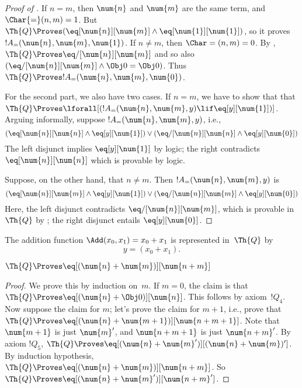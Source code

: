 \documentclass[../../../include/open-logic-section]{subfiles}
\begin{document}
\begin{proof}[Proof of ]
If $n = m$, then $\num{n}$ and $\num{m}$ are the same term, and
$\Char{=}(n, m) = 1$. But $\Th{Q} \Proves (\eq[\num{n}][\num{m}] \land
\eq[\num{1}][\num{1}])$, so it proves $!A_=(\num{n}, \num{m},
\num{1})$.  If $n \neq m$, then $\Char=(n, m) = 0$. By
, $\Th{Q} \Proves \eq/[\num{n}][\num{m}]$ and
so also $(\eq/[\num{n}][\num{m}] \land \Obj 0 = \Obj 0)$. Thus $\Th{Q}
\Proves !A_=(\num{n}, \num{m}, \num{0})$.

For the second part, we also have two cases. If $n = m$, we have to
show that that $\Th{Q} \Proves \lforall[(!A_=(\num{n}, \num{m}, y)
  \lif \eq[y][\num{1}])]$.  Arguing informally, suppose $!A_=(\num{n},
\num{m}, y)$, i.e.,
\[
(\eq[\num{n}][\num{n}] \land \eq[y][\num{1}]) \lor
(\eq/[\num{n}][\num{n}] \land \eq[y][\num{0}])
\]
The left disjunct implies $\eq[y][\num{1}]$ by logic; the right
contradicts $\eq[\num{n}][\num{n}]$ which is provable by logic.

Suppose, on the other hand, that $n \neq m$. Then $!A_=(\num{n},
\num{m}, y)$ is
\[
(\eq[\num{n}][\num{m}] \land \eq[y][\num{1}]) \lor
(\eq/[\num{n}][\num{m}] \land \eq[y][\num{0}])
\]
Here, the left disjunct contradicts $\eq/[\num{n}][\num{m}]$, which is
provable in $\Th{Q}$ by ; the right disjunct
entails $\eq[y][\num{0}]$.
\end{proof}

\begin{prop}
The addition function $\Add(x_0, x_1) = x_0+x_1$ is represented
in~$\Th{Q}$ by
\[
y = (x_0 + x_1).
\]
\end{prop}

\begin{lem}
$\Th{Q} \Proves \eq[(\num{n} + \num{m})][\num{n+m}]$
\end{lem}

\begin{proof}
We prove this by induction on~$m$. If $m = 0$, the claim is that
$\Th{Q} \Proves \eq[(\num{n} + \Obj 0)][\num{n}]$. This follows by
axiom~$!Q_4$.  Now suppose the claim for $m$; let's prove the claim
for $m+1$, i.e., prove that $\Th{Q} \Proves \eq[(\num{n} +
  \num{m+1})][\num{n+m+1}]$. Note that $\num{m+1}$ is just $\num{m}'$,
and $\num{n+m+1}$ is just $\num{n+m}'$.  By axiom $!Q_5$, $\Th{Q}
\Proves \eq[(\num{n} + \num{m}')][(\num{n}+\num{m})']$. By induction
hypothesis, $\Th{Q} \Proves \eq[(\num{n} + \num{m})][\num{n+m}]$. So
$\Th{Q} \Proves \eq[(\num{n} + \num{m}')][\num{n+m}']$.
\end{proof}
\end{document}
